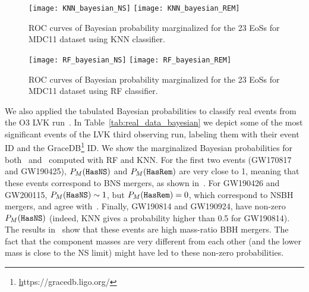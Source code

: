 \begin{figure*}%
\texttt{[image: KNN\_bayesian\_NS]}
\texttt{[image: KNN\_bayesian\_REM]}
\caption{ROC curves of Bayesian probability marginalized
    for the 23 EoSs for MDC11 dataset using \ac{KNN} classifier.}
\label{fig:rocMDC_KNN}
\end{figure*}

\begin{figure*}%
\texttt{[image: RF\_bayesian\_NS]}
\texttt{[image: RF\_bayesian\_REM]}
\caption{ROC curves of Bayesian probability marginalized for the 23 EoSs for MDC11 dataset using \ac{RF} classifier.}
\label{fig:rocMDC_RF}
\end{figure*}

We also applied the tabulated Bayesian probabilities to classify real events
from the O3 LVK run~\cite{gwtc-2:2021, LIGOScientific:2021djp}.  In Table~\ref{tab:real_data_bayesian} we depict some of the most significant events of the LVK third observing run, labeling them with their event ID and the GraceDB\footnote{\href{https://gracedb.ligo.org/}https://gracedb.ligo.org/} ID.  We show the marginalized Bayesian probabilities for both \hasns\ and \hasrem\ computed with 
\ac{RF} and \ac{KNN}. For the first two events (GW170817 and GW190425),
$P_M({{\tt HasNS}})$ and $P_M({{\tt HasRem}})$ are very close to 1, meaning that these events
correspond to BNS mergers, as shown in~\cite{gwtc-2:2021,LIGOScientific:2021djp}. 
For GW190426 and GW200115, $P_M({{\tt HasNS}}) \sim 1$, but
$P_M({{\tt HasRem}}) = 0$, which correspond to NSBH mergers, and agree 
with~\cite{gwtc-2:2021, LIGOScientific:2021djp}. Finally, GW190814 and GW190924,
have non-zero $P_M({{\tt HasNS}})$ (indeed, \ac{KNN} gives a probability higher than
0.5 for GW190814). The results in~\cite{gwtc-2:2021, LIGOScientific:2021djp} show that these events are high mass-ratio BBH mergers. The fact that the component masses are very different from each other (and the lower mass is close to the NS limit) might have led to these non-zero probabilities. 


